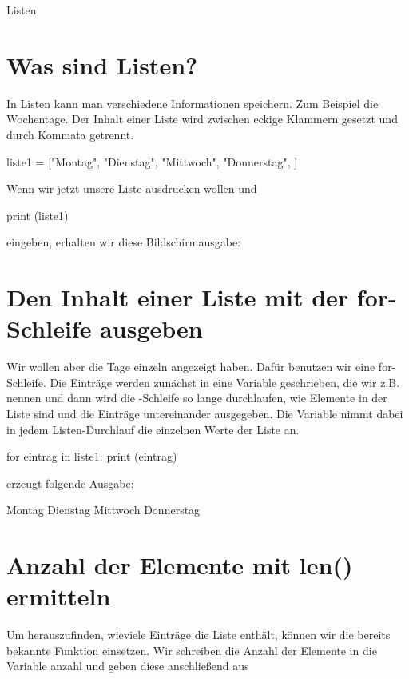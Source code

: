 \documentclass{\VorlagenPfad/coderdojokatext}
\newcommand{\Titel}{Listen}
\begin{document}
	
\begin{center}
	{\huge \Titel}
\end{center}


\section{Was sind Listen?}
In Listen kann man verschiedene Informationen speichern. Zum Beispiel die Wochentage. Der Inhalt einer Liste wird zwischen eckige Klammern gesetzt \code{[….]} und durch Kommata getrennt. 

\begin{pythoncode}
liste1 = ["Montag", "Dienstag", "Mittwoch", "Donnerstag", ]
\end{pythoncode}
Wenn wir jetzt unsere Liste ausdrucken wollen und

\begin{pythoncode}
print (liste1)
\end{pythoncode}

eingeben, erhalten wir diese Bildschirmausgabe:

\begin{pythoncode}
\end{pythoncode}

\section{Den Inhalt einer Liste mit der for-Schleife ausgeben}
Wir wollen aber die Tage einzeln angezeigt haben. Dafür benutzen wir eine 
for-Schleife. Die Einträge werden zunächst in eine Variable geschrieben, die wir  z.B.  nennen und dann wird die -Schleife so lange durchlaufen, wie Elemente in der Liste sind und die Einträge untereinander ausgegeben. Die Variable  nimmt dabei in jedem Listen-Durchlauf die einzelnen Werte der Liste an.
\begin{pythoncode}
for eintrag in liste1:
	print (eintrag)
\end{pythoncode}
erzeugt folgende Ausgabe:
\begin{pseudocode}
Montag
Dienstag
Mittwoch
Donnerstag	
\end{pseudocode}

\section{Anzahl der Elemente mit len() ermitteln}
Um herauszufinden, wieviele Einträge die Liste enthält, können wir die bereits bekannte Funktion  einsetzen. Wir schreiben die Anzahl der Elemente in die Variable anzahl und geben diese anschließend aus
\end{document}
